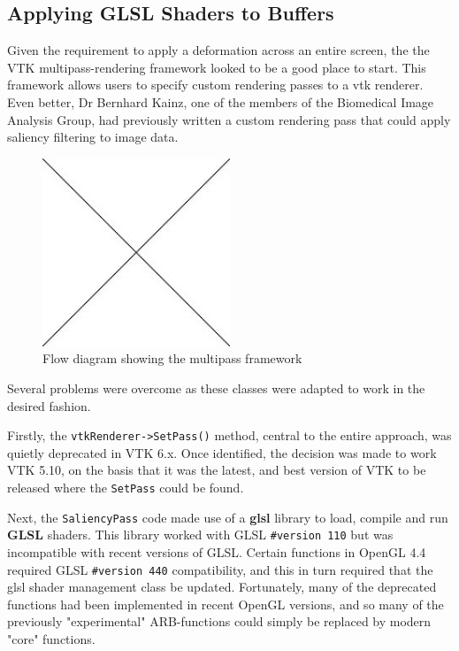 \documentclass[MSc,paper=a4,pagesize=auto]{icldt}
\begin{document}
\subsection{Applying GLSL Shaders to Buffers}
Given the requirement to apply a deformation across an entire screen, the the VTK multipass-rendering framework looked to be a good place to start. This framework allows users to specify custom rendering passes to a vtk renderer. Even better, Dr Bernhard Kainz, one of the members of the Biomedical Image Analysis Group, had previously written a custom rendering pass that could apply saliency filtering to image data.

\begin{figure}[htbp!]
    \centering
    \includegraphics[width=0.5\textwidth]{resources/placeholder}
    \caption{Flow diagram showing the multipass framework}
    \label{fig:multipass_rendering}
\end{figure}

Several problems were overcome as these classes were adapted to work in the desired fashion.

Firstly, the \texttt{vtkRenderer->SetPass()} method, central to the entire approach, was quietly deprecated in VTK 6.x. Once identified,  the decision was made to work VTK 5.10, on the basis that it was the latest, and best version of VTK to be released where the \texttt{SetPass} could be found.

Next, the \texttt{SaliencyPass} code made use of a \textbf{glsl} library to load, compile and run \textbf{GLSL} shaders. This library worked with GLSL \texttt{\#version 110} but was incompatible with recent versions of GLSL. Certain functions in OpenGL 4.4 required GLSL \texttt{\#version 440} compatibility, and this in turn required that the glsl shader management class be updated. Fortunately, many of the deprecated functions had been implemented in recent OpenGL versions, and so many of the previously "experimental" ARB-functions could simply be replaced by modern "core" functions.
\end{document}
